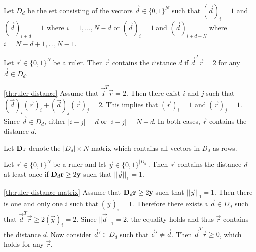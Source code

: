 \documentclass[a4paper, openany, oneside]{memoir}
\begin{document}
Let $D_d$ be the set consisting of the vectors $\vec{d} \in \{0,1\}^N$ such that $(\vec{d})_i=1$ and $(\vec{d})_{i+d}=1$ where $i = 1,\ldots,N-d$ or $(\vec{d})_i=1$ and $(\vec{d})_{i+d-N}$ where $i = N-d+1,\ldots,N-1$.

\begin{blockTheorem} \label{th:ruler-distance}\nolinebreak
    Let $\vec{r} \in \{0,1\}^N$ be a ruler. Then $\vec{r}$ contains the distance $d$ if $\vec{d}^T \vec{r} = 2$ for any $\vec{d} \in D_d$.\nolinebreak
\end{blockTheorem}

\begin{blockProofTheorem}{\ref{th:ruler-distance}}
    Assume that $\vec{d}^T\vec{r} = 2$. Then there exist $i$ and $j$ such that $(\vec{d})_i (\vec{r})_i + (\vec{d})_j (\vec{r})_j = 2$. This implies that $(\vec{r})_i = 1$ and $(\vec{r})_j = 1$. Since $\vec{d} \in D_d$, either $|i-j|=d$ or $|i-j| = N-d$. In both cases, $\vec{r}$ contains the distance $d$. 
\end{blockProofTheorem}

Let $\boldsymbol{\mathbf{D}}_d$ denote the $|D_d| \times N$ matrix which contains all vectors in $D_d$ as rows.

\begin{blockTheorem} \label{th:ruler-distance-matrix}\nolinebreak
    Let $\vec{r} \in \{0,1\}^N$ be a ruler and let $\vec{y} \in \{0,1\}^{|D_d|}$. Then $\vec{r}$ contains the distance $d$ at least once if $\boldsymbol{\mathbf{D}}_d \boldsymbol{\mathbf{r}} \ge 2\boldsymbol{\mathbf{y}}$ such that $||\vec{y}||_1 = 1$.
\end{blockTheorem}

\begin{blockProofTheorem}{\ref{th:ruler-distance-matrix}}
    Assume that $\boldsymbol{\mathbf{D}}_d \boldsymbol{\mathbf{r}} \ge 2 \boldsymbol{\mathbf{y}}$ such that $||\vec{y}||_1 = 1$. Then there is one and only one $i$ such that $(\vec{y})_i=1$. Therefore there exists a $\vec{d} \in D_d$ such that $\vec{d}^T \vec{r} \ge 2 (\vec{y})_i = 2$. Since $||\vec{d}||_1=2$, the equality holds and thus $\vec{r}$ contains the distance $d$. Now consider $\vec{d}' \in D_d$ such that $\vec{d}' \neq \vec{d}$. Then $\vec{d}^T \vec{r} \ge 0$, which holds for any $\vec{r}$.  
\end{blockProofTheorem}
\end{document}
